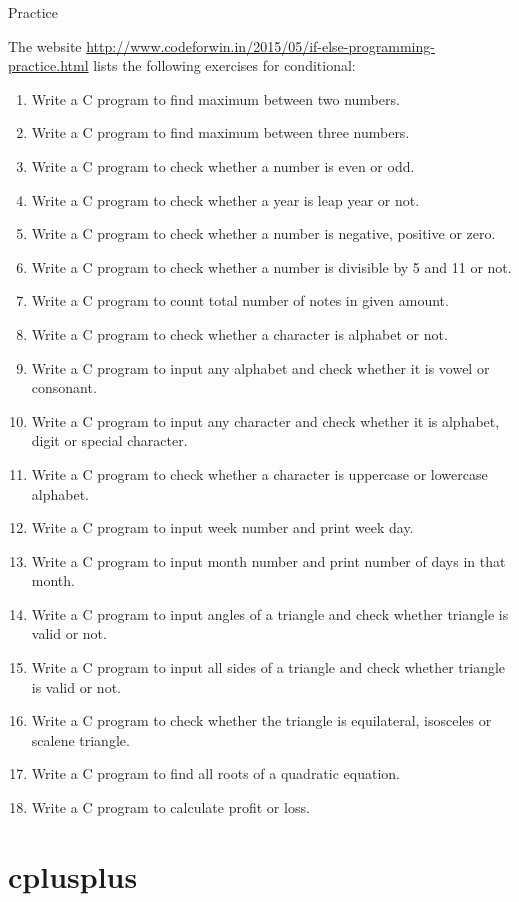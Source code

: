  {Practice}

The website
\url{http://www.codeforwin.in/2015/05/if-else-programming-practice.html}
lists the following exercises for conditional:

\begin{enumerate}
\item Write a C program to find maximum between two numbers.
\item  Write a C program to find maximum between three numbers.
\item  Write a C program to check whether a number is even or odd.
\item  Write a C program to check whether a year is leap year or not.
\item  Write a C program to check whether a number is negative, positive or
  zero.
\item  Write a C program to check whether a number is divisible by 5 and 11
  or not.
\item  Write a C program to count total number of notes in given amount.
\item  Write a C program to check whether a character is alphabet or not.
\item  Write a C program to input any alphabet and check whether it is
  vowel or consonant.
\item  Write a C program to input any character and check whether it is
  alphabet, digit or special character.
\item  Write a C program to check whether a character is uppercase or
  lowercase alphabet.
\item  Write a C program to input week number and print week day.
\item  Write a C program to input month number and print number of days in
  that month.
\item  Write a C program to input angles of a triangle and check whether
  triangle is valid or not.
\item  Write a C program to input all sides of a triangle and check whether
  triangle is valid or not.
\item  Write a C program to check whether the triangle is equilateral,
  isosceles or scalene triangle.
\item  Write a C program to find all roots of a quadratic equation.
\item  Write a C program to calculate profit or loss.
\end{enumerate}

\section{cplusplus}

